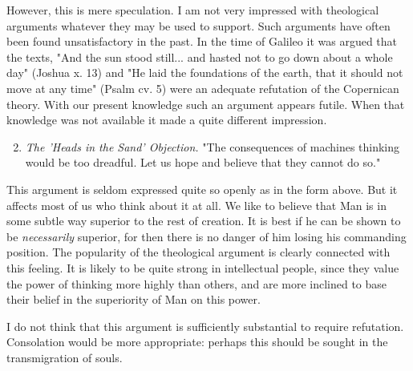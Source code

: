 \documentclass[12pt]{article}
\begin{document}
    However, this is mere speculation. I am not very impressed with theological arguments whatever they may be used to support. Such arguments have often been found unsatisfactory in the past. In the time of Galileo it was argued that the texts, "And the sun stood still... and hasted not to go down about a whole day" (Joshua x. 13) and "He laid the foundations of the earth, that it should not move at any time" (Psalm cv. 5) were an adequate refutation of the Copernican theory. With our present knowledge such an argument appears futile. When that knowledge was not available it made a quite different impression.
    
    \begin{enumerate}[label=(\arabic*)]
        \setcounter{enumi}{1}
        \item{\textit{The 'Heads in the Sand' Objection.} "The consequences of machines thinking would be too dreadful. Let us hope and believe that they cannot do so."}
    \end{enumerate}

    This argument is seldom expressed quite so openly as in the form above. But it affects most of us who think about it at all. We like to believe that Man is in some subtle way superior to the rest of creation. It is best if he can be shown to be \textit{necessarily} superior, for then there is no danger of him losing his commanding position. The popularity of the theological argument is clearly connected with this feeling. It is likely to be quite strong in intellectual people, since they value the power of thinking more highly than others, and are more inclined to base their belief in the superiority of Man on this power.

    I do not think that this argument is sufficiently substantial to require refutation. Consolation would be more appropriate: perhaps this should be sought in the transmigration of souls.
\end{document}
